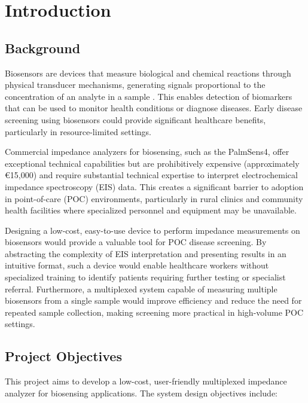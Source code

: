 \graphicspath{{introduction/fig/}}

\chapter{Introduction}
\label{chap:introduction}

\section{Background}

Biosensors are devices that measure biological and chemical reactions through physical transducer mechanisms, generating signals proportional to the concentration of an analyte in a sample \cite{bhallaIntroductionBiosensors2016} . This enables detection of biomarkers that can be used to monitor health conditions or diagnose diseases. Early disease screening using biosensors could provide significant healthcare benefits, particularly in resource-limited settings.

Commercial impedance analyzers for biosensing, such as the PalmSens4, offer exceptional technical capabilities but are prohibitively expensive (approximately €15,000) and require substantial technical expertise to interpret electrochemical impedance spectroscopy (EIS) data. This creates a significant barrier to adoption in point-of-care (POC) environments, particularly in rural clinics and community health facilities where specialized personnel and equipment may be unavailable.

Designing a low-cost, easy-to-use device to perform impedance measurements on biosensors would provide a valuable tool for POC disease screening. By abstracting the complexity of EIS interpretation and presenting results in an intuitive format, such a device would enable healthcare workers without specialized training to identify patients requiring further testing or specialist referral. Furthermore, a multiplexed system capable of measuring multiple biosensors from a single sample would improve efficiency and reduce the need for repeated sample collection, making screening more practical in high-volume POC settings.

\section{Project Objectives}

This project aims to develop a low-cost, user-friendly multiplexed impedance analyzer for biosensing applications. The system design objectives include:

